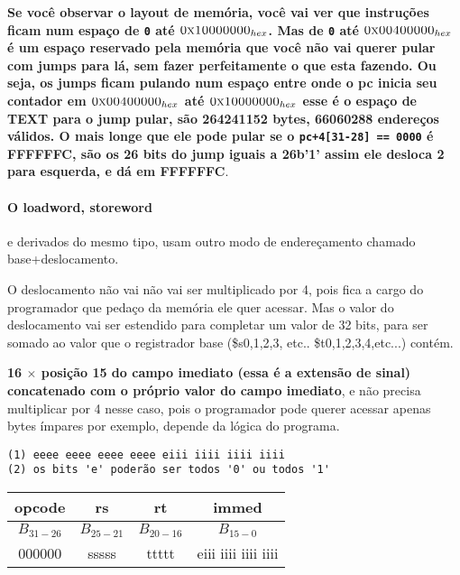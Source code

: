 \documentclass{article}
\begin{document}
{\color{Red} \bfseries Se você observar o layout de memória, você vai ver que
instruções ficam num espaço de \verb|0| até $\textsc{0x10000000}_{hex}$. Mas de
\verb|0| até $\textsc{0x00400000}_{hex}$ é um espaço reservado pela memória que
você não vai querer pular com jumps para lá, sem fazer perfeitamente o que esta
fazendo. Ou seja, os jumps ficam pulando num espaço entre onde o pc inicia seu
contador em $\textsc{0x00400000}_{hex}$ até $\textsc{0x10000000}_{hex}$ esse é
o espaço de \textsc{TEXT} para o jump pular, são 264241152 bytes, 66060288
endereços válidos. O mais longe que ele pode pular se o
\verb|pc+4[31-28] == 0000| é FFFFFFC, são os 26 bits do jump iguais a 26{b'1'}
assim ele desloca 2 para esquerda, e dá em FFFFFFC}.

\pagebreak
\paragraph{O loadword, storeword} e derivados do mesmo tipo, usam outro modo de
endereçamento chamado base+deslocamento.

O deslocamento não vai não vai ser multiplicado por 4, pois fica a cargo do
programador que pedaço da memória ele quer acessar. Mas o valor do deslocamento
vai ser estendido para completar um valor de 32 bits, para ser somado ao valor
que o registrador base (\$s0,1,2,3, etc.. \$t0,1,2,3,4,etc...) contém.

\textbf{16 $\times$ {posição 15 do campo imediato} (essa é a extensão de
sinal) concatenado com o próprio valor do campo imediato}, e não precisa
multiplicar por 4 nesse caso, pois o programador pode querer acessar apenas
bytes ímpares por exemplo, depende da lógica do programa.

\begin{verbatim}
(1) eeee eeee eeee eeee eiii iiii iiii iiii
(2) os bits 'e' poderão ser todos '0' ou todos '1'
\end{verbatim}

\begin{table}[ht!]
  \begin{tabular}{|c|c|c|c|}
    \hline opcode & rs & rt & immed \\
    \hline $B_{31-26}$ & $B_{25-21}$ & $B_{20-16}$ & $B_{15-0}$ \\
    \hline 000000 & sssss & ttttt & eiii iiii iiii iiii \\
    \hline
  \end{tabular}
\end{table}
\end{document}
